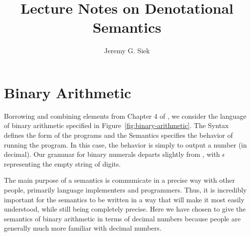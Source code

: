 \documentclass{tufte-handout}
\title{Lecture Notes on Denotational Semantics}
\author{Jeremy G. Siek}
\begin{document}
\maketitle

\tableofcontents

\clearpage


\section{Binary Arithmetic}
\label{sec:binary-arithmetic}


Borrowing and combining elements from Chapter 4 of
\citet{Schmidt:1986vn}, we consider the language of binary arithmetic
specified in Figure~\ref{fig:binary-arithmetic}.  The Syntax defines
the form of the programs and the Semantics specifies the behavior of
running the program. In this case, the behavior is simply to output a
number (in decimal).  Our grammar for binary numerals departs slightly
from \citet{Schmidt:1986vn}, with $\epsilon$ representing the empty
string of digits.

The main purpose of a semantics is communicate in a precise way with
other people, primarily language implementers and programmers.  Thus,
it is incredibly important for the semantics to be written in a way
that will make it most easily understood, while still being completely
precise.  Here we have chosen to give the semantics of binary
arithmetic in terms of decimal numbers because people are generally
much more familiar with decimal numbers. 
\end{document}
